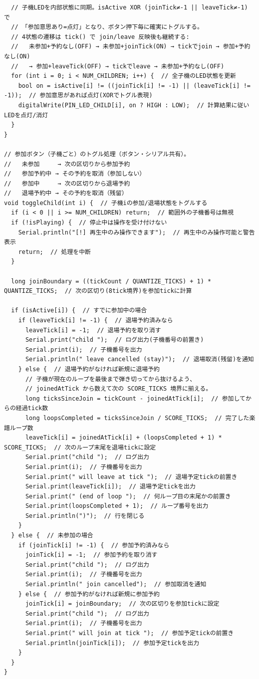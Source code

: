 \documentclass[uplatex,dvipdfmx]{jlreq}
\begin{document}
\begin{lstlisting}
  // 子機LEDを内部状態に同期。isActive XOR (joinTick≠-1 || leaveTick≠-1) で
  // 「参加意思あり=点灯」となり、ボタン押下毎に確実にトグルする。
  // 4状態の遷移は tick() で join/leave 反映後も継続する:
  //   未参加+予約なし(OFF) → 未参加+joinTick(ON) → tickでjoin → 参加+予約なし(ON)
  //   → 参加+leaveTick(OFF) → tickでleave → 未参加+予約なし(OFF)
  for (int i = 0; i < NUM_CHILDREN; i++) {  // 全子機のLED状態を更新
    bool on = isActive[i] != ((joinTick[i] != -1) || (leaveTick[i] != -1));  // 参加意思があれば点灯(XORでトグル表現)
    digitalWrite(PIN_LED_CHILD[i], on ? HIGH : LOW);  // 計算結果に従いLEDを点灯/消灯
  }
}

// 参加ボタン（子機ごと）のトグル処理（ボタン・シリアル共有）。
//   未参加     → 次の区切りから参加予約
//   参加予約中 → その予約を取消（参加しない）
//   参加中     → 次の区切りから退場予約
//   退場予約中 → その予約を取消（残留）
void toggleChild(int i) {  // 子機iの参加/退場状態をトグルする
  if (i < 0 || i >= NUM_CHILDREN) return;  // 範囲外の子機番号は無視
  if (!isPlaying) {  // 停止中は操作を受け付けない
    Serial.println("[!] 再生中のみ操作できます");  // 再生中のみ操作可能と警告表示
    return;  // 処理を中断
  }

  long joinBoundary = ((tickCount / QUANTIZE_TICKS) + 1) * QUANTIZE_TICKS;  // 次の区切り(8tick境界)を参加tickに計算

  if (isActive[i]) {  // すでに参加中の場合
    if (leaveTick[i] != -1) {  // 退場予約済みなら
      leaveTick[i] = -1;  // 退場予約を取り消す
      Serial.print("child ");  // ログ出力(子機番号の前置き)
      Serial.print(i);  // 子機番号を出力
      Serial.println(" leave cancelled (stay)");  // 退場取消(残留)を通知
    } else {  // 退場予約がなければ新規に退場予約
      // 子機が現在のループを最後まで弾き切ってから抜けるよう、
      // joinedAtTick から数えて次の SCORE_TICKS 境界に揃える。
      long ticksSinceJoin = tickCount - joinedAtTick[i];  // 参加してからの経過tick数
      long loopsCompleted = ticksSinceJoin / SCORE_TICKS;  // 完了した楽譜ループ数
      leaveTick[i] = joinedAtTick[i] + (loopsCompleted + 1) * SCORE_TICKS;  // 次のループ末尾を退場tickに設定
      Serial.print("child ");  // ログ出力
      Serial.print(i);  // 子機番号を出力
      Serial.print(" will leave at tick ");  // 退場予定tickの前置き
      Serial.print(leaveTick[i]);  // 退場予定tickを出力
      Serial.print(" (end of loop ");  // 何ループ目の末尾かの前置き
      Serial.print(loopsCompleted + 1);  // ループ番号を出力
      Serial.println(")");  // 行を閉じる
    }
  } else {  // 未参加の場合
    if (joinTick[i] != -1) {  // 参加予約済みなら
      joinTick[i] = -1;  // 参加予約を取り消す
      Serial.print("child ");  // ログ出力
      Serial.print(i);  // 子機番号を出力
      Serial.println(" join cancelled");  // 参加取消を通知
    } else {  // 参加予約がなければ新規に参加予約
      joinTick[i] = joinBoundary;  // 次の区切りを参加tickに設定
      Serial.print("child ");  // ログ出力
      Serial.print(i);  // 子機番号を出力
      Serial.print(" will join at tick ");  // 参加予定tickの前置き
      Serial.println(joinTick[i]);  // 参加予定tickを出力
    }
  }
}


\end{lstlisting}
\end{document}
